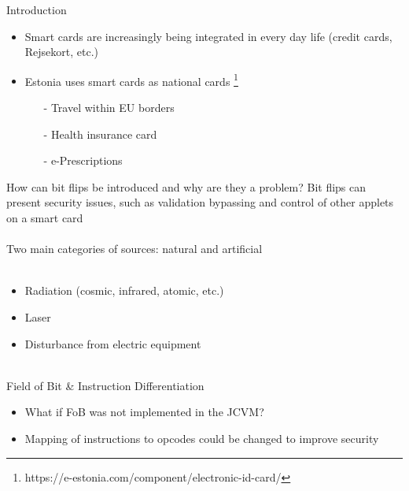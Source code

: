 


\begin{frame}[fragile]{Introduction}
\begin{center}
	\begin{itemize}
	\item Smart cards are increasingly being integrated in every day life (credit cards, Rejsekort, etc.)
	\item Estonia uses smart cards as national cards \footnote{https://e-estonia.com/component/electronic-id-card/}
		\begin{itemize}
		\item[-] Travel within EU borders
		\item[-] Health insurance card
		\item[-] e-Prescriptions
		\end{itemize}
	\end{itemize}
\end{center}
\end{frame}

\begin{frame}[fragile]{\large How can bit flips be introduced and why are they a problem?}
Bit flips can present security issues, such as validation bypassing and control of other applets on a smart card\\~\\
Two main categories of sources: natural and artificial\\~\\
	\begin{itemize}
	\item Radiation (cosmic, infrared, atomic, etc.)
	\item Laser
    \item Disturbance from electric equipment\\~\\
	\end{itemize}
\end{frame}

\begin{frame}[fragile]{Field of Bit \& Instruction Differentiation}
\begin{itemize}
\item What if FoB was not implemented in the JCVM?
\item Mapping of instructions to opcodes could be changed to improve security
\end{itemize}
\end{frame}


